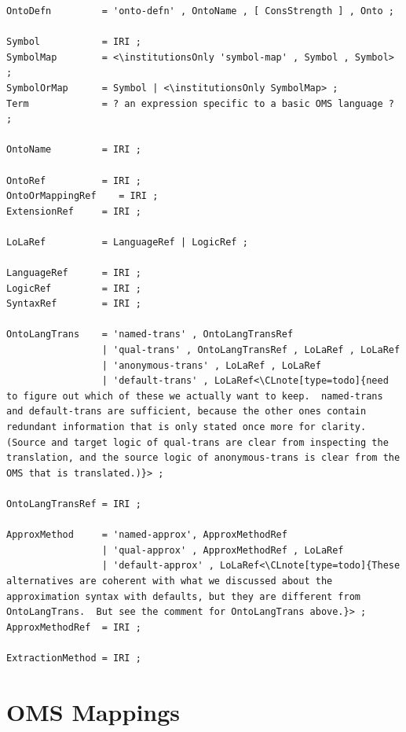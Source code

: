 \documentclass[10pt,%
\ifpretendfinal
final%
\else
draft%
\fi,
]{scrreprt}
\makeatletter
\newcommand*\CommentAuthor{}
\renewcommand*\CommentAuthor{#1}}
\newcommand*\CommentDate{}
\renewcommand*\CommentDate{#1}}
\newcommand*\CommentId{}
\renewcommand*\CommentId{#1}}
\newcommand*\CommentType{}
\renewcommand*\CommentType{#1}}
\newcommand*{\SetCommentColorByType}[1]{%
\edef\localType{{#1}}%
\expandafter\ifstrequal\localType{q-aut}{\colorlet{CommentColor}{red}}{%
\expandafter\ifstrequal\localType{q-all}{\colorlet{CommentColor}{orange}}{%
\expandafter\ifstrequal\localType{todo}{\colorlet{CommentColor}{orange}}{%
\expandafter\ifstrequal\localType{fyi}{\colorlet{CommentColor}{lightgray}}{%
\colorlet{CommentColor}{yellow}}}}}}
\newcommand*{\SetCommentPrefixByType}[1]{%
\edef\localType{{#1}}%
\expandafter\@ifmtarg\localType{%
\edef\CommentPrefix{}%
}{%
\caseupper[q]{#1}%
\edef\CommentPrefix{\thestring: }%
}}
\newcommand*{\initComment}[1]{%
\setkeys{Comment}{#1}%
\SetCommentColorByType{\CommentType}%
\relax%
\SetCommentPrefixByType{\CommentType}%
\relax%
}
\newcommand*{\todonote}[2][]{%
\initComment{#1}%
\pdfcomment[author=\CommentAuthor,color=CommentColor,date=\CommentDate,id=\CommentId]{%
\CommentPrefix
#2}}
\renewcommand*{\todonote}[2][]{%
\initComment{#1}%
\ednote{\CommentPrefix #2}}
\newcommand*{\CLnote}[2][author=Christoph Lange]{%
\todonote[author=Christoph Lange,#1]{#2} 
}
\newcommand*{\institutionsOnly}{\bfseries\itshape}
\newcommand{\sclause}[1]{\section{#1}}
\makeatother
\begin{document}
\begin{lstlisting}[language=ebnf,escapeinside={<>}]
OntoDefn         = 'onto-defn' , OntoName , [ ConsStrength ] , Onto ;
                 
Symbol           = IRI ;
SymbolMap        = <\institutionsOnly 'symbol-map' , Symbol , Symbol> ;
SymbolOrMap      = Symbol | <\institutionsOnly SymbolMap> ;
Term             = ? an expression specific to a basic OMS language ? ;
                 
OntoName         = IRI ;
                 
OntoRef          = IRI ;
OntoOrMappingRef    = IRI ;
ExtensionRef     = IRI ;
                 
LoLaRef          = LanguageRef | LogicRef ;
                 
LanguageRef      = IRI ;
LogicRef         = IRI ;
SyntaxRef        = IRI ;
                 
OntoLangTrans    = 'named-trans' , OntoLangTransRef
                 | 'qual-trans' , OntoLangTransRef , LoLaRef , LoLaRef
                 | 'anonymous-trans' , LoLaRef , LoLaRef
                 | 'default-trans' , LoLaRef<\CLnote[type=todo]{need to figure out which of these we actually want to keep.  named-trans and default-trans are sufficient, because the other ones contain redundant information that is only stated once more for clarity.  (Source and target logic of qual-trans are clear from inspecting the translation, and the source logic of anonymous-trans is clear from the OMS that is translated.)}> ;
                 
OntoLangTransRef = IRI ;
                 
ApproxMethod     = 'named-approx', ApproxMethodRef
                 | 'qual-approx' , ApproxMethodRef , LoLaRef
                 | 'default-approx' , LoLaRef<\CLnote[type=todo]{These alternatives are coherent with what we discussed about the approximation syntax with defaults, but they are different from OntoLangTrans.  But see the comment for OntoLangTrans above.}> ;
ApproxMethodRef  = IRI ;

ExtractionMethod = IRI ;
\end{lstlisting}


\sclause{OMS Mappings}
\end{document}
